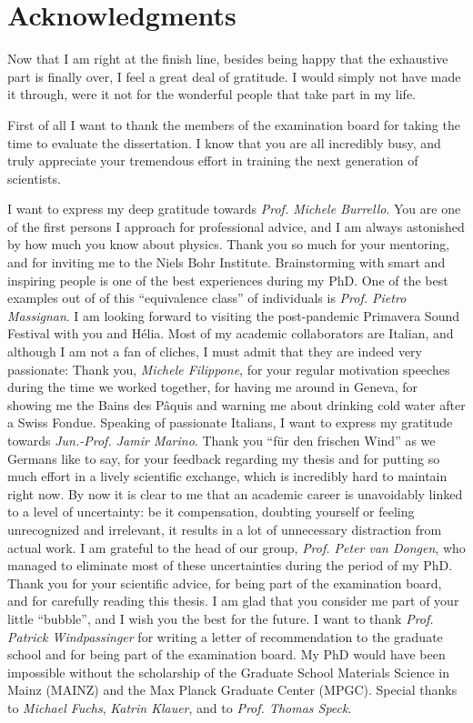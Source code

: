 \chapter*{Acknowledgments}
Now that I am right at the finish line, besides being happy that the exhaustive part is finally over, I feel a great deal of gratitude.
I would simply not have made it through, were it not for the wonderful people that take part in my life.

First of all I want to thank the members of the examination board for taking the time to evaluate the dissertation.
I know that you are all incredibly busy, and truly appreciate your tremendous effort in training the next generation of scientists.

I want to express my deep gratitude towards {\it Prof. Michele Burrello}.
You are one of the first persons I approach for professional advice, and I am always astonished by how much you know about physics.
Thank you so much for your mentoring, and for inviting me to the Niels Bohr Institute.
Brainstorming with smart and inspiring people is one of the best experiences during my PhD.
One of the best examples out of of this ``equivalence class'' of individuals is {\it Prof. Pietro Massignan}.
I am looking forward to visiting the post-pandemic Primavera Sound Festival with you and Hélia.
Most of my academic collaborators are Italian, and although I am not a fan of cliches, I must admit that they are indeed very passionate:
Thank you, {\it Michele Filippone}, for your regular motivation speeches during the time we worked together, for having me around in Geneva, for showing me the Bains des Pâquis and warning me about drinking cold water after a Swiss Fondue.
Speaking of passionate Italians, I want to express my gratitude towards {\it Jun.-Prof. Jamir Marino}.
Thank you ``für den frischen Wind'' as we Germans like to say, for your feedback regarding my thesis and for putting so much effort in a lively scientific exchange, which is incredibly hard to maintain right now.
By now it is clear to me that an academic career is unavoidably linked to a level of uncertainty: be it compensation, doubting yourself or feeling unrecognized and irrelevant, it results in a lot of unnecessary distraction from actual work.
I am grateful to the head of our group, {\it Prof. Peter van Dongen}, who managed to eliminate most of these uncertainties during the period of my PhD.
Thank you for your scientific advice, for being part of the examination board, and for carefully reading this thesis.
I am glad that you consider me part of your little ``bubble'', and I wish you the best for the future.
I want to thank {\it Prof. Patrick Windpassinger} for writing a letter of recommendation to the graduate school and for being part of the examination board.
My PhD would have been impossible without the scholarship of the Graduate School Materials Science in Mainz (MAINZ) and the Max Planck Graduate Center (MPGC).
Special thanks to {\it Michael Fuchs}, {\it Katrin Klauer}, and to {\it Prof. Thomas Speck}.

